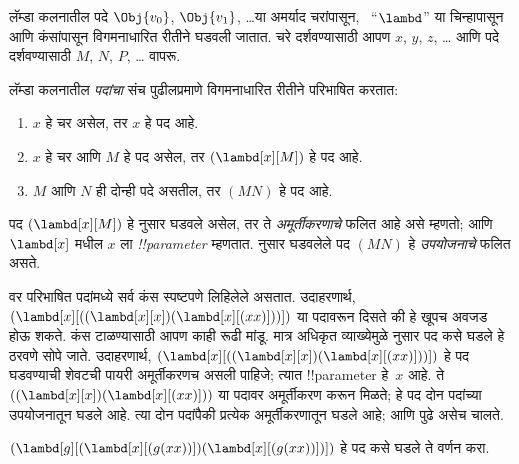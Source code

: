 \documentclass[../../../include/open-logic-section]{subfiles}
\begin{document}

लॅम्डा कलनातील पदे $\Obj{v_0}$, $\Obj{v_1}$, \dots या
अमर्याद चरांपासून, ~“$\lambd$” या चिन्हापासून आणि कंसांपासून
विगमनाधारित रीतीने घडवली जातात. चरे दर्शवण्यासाठी आपण
$x$, $y$, $z$, \dots{} आणि पदे दर्शवण्यासाठी
$M$, $N$, $P$, \dots{} वापरू.

\begin{defn}[पदे] 
लॅम्डा कलनातील \emph{पदांचा} संच पुढीलप्रमाणे
विगमनाधारित रीतीने परिभाषित करतात:
\begin{enumerate}
  \item {} $x$ हे चर असेल, तर $x$ हे
    पद आहे.
  \item {} $x$ हे चर आणि $M$ हे
    पद असेल, तर $(\lambd[x][M])$ हे पद आहे.
  \item {} $M$ आणि $N$ ही दोन्ही
    पदे असतील, तर $(MN)$ हे पद आहे.
\end{enumerate}
\end{defn}

पद $(\lambd[x][M])$ हे  नुसार
घडवले असेल, तर ते \emph{अमूर्तीकरणाचे} फलित आहे
असे म्हणतो; आणि $\lambd[x]$ मधील $x$ ला
\emph{!!{parameter}} म्हणतात. 
नुसार घडवलेले पद $(MN)$ हे \emph{उपयोजनाचे}
फलित असते.

वर परिभाषित पदांमध्ये सर्व कंस स्पष्टपणे लिहिलेले
असतात. उदाहरणार्थ,
$(\lambd[x][((\lambd[x][x])(\lambd[x][(xx)]))])$
या पदावरून दिसते की हे खूपच अवजड होऊ शकते. कंस
टाळण्यासाठी आपण काही रूढी मांडू. मात्र अधिकृत
व्याख्येमुळे  नुसार पद कसे
घडले हे ठरवणे सोपे जाते. उदाहरणार्थ,
$(\lambd[x][((\lambd[x][x])(\lambd[x][(xx)]))])$
हे पद घडवण्याची शेवटची पायरी अमूर्तीकरणच असली
पाहिजे; त्यात !!{parameter} हे~$x$ आहे.
ते $((\lambd[x][x])(\lambd[x][(xx)]))$ या पदावर
अमूर्तीकरण करून मिळते; हे पद दोन पदांच्या
उपयोजनातून घडले आहे. त्या दोन पदांपैकी प्रत्येक
अमूर्तीकरणातून घडले आहे; आणि पुढे असेच चालते.

\begin{prob}
$(\lambd[g][(\lambd[x][(g (x x))])
  (\lambd[x][(g (x x))])])$ हे पद कसे घडले ते वर्णन करा.
\end{prob}
\end{document}
